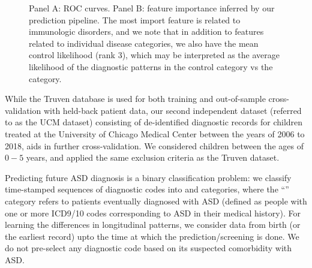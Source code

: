 \documentclass[onecolumn, compsoc,11pt]{IEEEtran}
\renewcommand{\captionN}[1]{\caption{\color{CadetBlue4!80!black} \sffamily \fontsize{9}{10}\selectfont #1  }}
\begin{document}
\begin{figure}
   \tikzexternaldisable

     \vspace{-10pt}

  \captionN{Panel A:  ROC curves. Panel B: feature importance inferred by our prediction pipeline. The most import feature is related to immunologic disorders, and we note that in addition to features related to individual disease categories, we also have the mean control likelihood (rank 3), which may be interpreted as the average likelihood of the diagnostic patterns in the control category vs the \treatment category. 
     }\label{fig1}
        \vspace{-15pt}

\end{figure}While the Truven database is used for both training and out-of-sample cross-validation with held-back patient data, our second independent dataset (referred to as the UCM dataset) consisting of de-identified diagnostic records for children treated at the University of Chicago Medical Center between the years of 2006 to 2018, aids in further cross-validation. We considered children between the ages of $0-5$ years, and  applied the same exclusion criteria as the Truven dataset.

Predicting  future ASD diagnosis   is a  binary classification problem: we classify time-stamped sequences of diagnostic codes  into \treatment and \control categories, where the ``\treatment'' category refers to patients eventually  diagnosed with ASD (defined as people with one or more ICD9/10 codes corresponding to ASD in their medical history). 
For learning the differences in longitudinal patterns, we consider  data from birth (or the earliest record) upto the time at which the prediction/screening is done.
We do not pre-select any diagnostic   code based on its  suspected comorbidity with ASD. 
\end{document}
